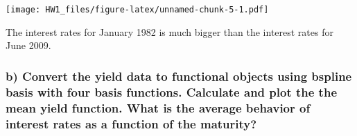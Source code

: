 \documentclass[
]{article}
\newenvironment{Shaded}{\begin{snugshade}}{\end{snugshade}}
\newcommand{\AttributeTok}[1]{\textcolor[rgb]{0.77,0.63,0.00}{#1}}
\newcommand{\DecValTok}[1]{\textcolor[rgb]{0.00,0.00,0.81}{#1}}
\newcommand{\FunctionTok}[1]{\textcolor[rgb]{0.00,0.00,0.00}{#1}}
\newcommand{\NormalTok}[1]{#1}
\newcommand{\OtherTok}[1]{\textcolor[rgb]{0.56,0.35,0.01}{#1}}
\newcommand{\SpecialCharTok}[1]{\textcolor[rgb]{0.00,0.00,0.00}{#1}}
\newcommand{\StringTok}[1]{\textcolor[rgb]{0.31,0.60,0.02}{#1}}
\begin{document}
\begin{Shaded}
\end{Shaded}

\texttt{[image: HW1\_files/figure-latex/unnamed-chunk-5-1.pdf]}

The interest rates for January 1982 is much bigger than the interest
rates for June 2009.

\hypertarget{b-convert-the-yield-data-to-functional-objects-using-bspline-basis-with-four-basis-functions.-calculate-and-plot-the-the-mean-yield-function.-what-is-the-average-behavior-of-interest-rates-as-a-function-of-the-maturity}{%
\subsubsection{b) Convert the yield data to functional objects using
bspline basis with four basis functions. Calculate and plot the the mean
yield function. What is the average behavior of interest rates as a
function of the
maturity?}\label{b-convert-the-yield-data-to-functional-objects-using-bspline-basis-with-four-basis-functions.-calculate-and-plot-the-the-mean-yield-function.-what-is-the-average-behavior-of-interest-rates-as-a-function-of-the-maturity}}

\begin{Shaded}
\end{Shaded}
\end{document}
